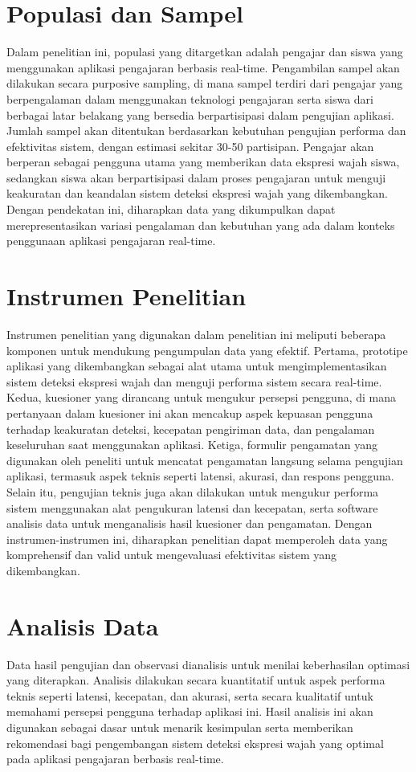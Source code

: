 \section{Populasi dan Sampel}
Dalam penelitian ini, populasi yang ditargetkan adalah pengajar dan siswa yang menggunakan aplikasi pengajaran berbasis real-time. Pengambilan sampel akan dilakukan secara purposive sampling, di mana sampel terdiri dari pengajar yang berpengalaman dalam menggunakan teknologi pengajaran serta siswa dari berbagai latar belakang yang bersedia berpartisipasi dalam pengujian aplikasi. Jumlah sampel akan ditentukan berdasarkan kebutuhan pengujian performa dan efektivitas sistem, dengan estimasi sekitar 30-50 partisipan. Pengajar akan berperan sebagai pengguna utama yang memberikan data ekspresi wajah siswa, sedangkan siswa akan berpartisipasi dalam proses pengajaran untuk menguji keakuratan dan keandalan sistem deteksi ekspresi wajah yang dikembangkan. Dengan pendekatan ini, diharapkan data yang dikumpulkan dapat merepresentasikan variasi pengalaman dan kebutuhan yang ada dalam konteks penggunaan aplikasi pengajaran real-time.

\section{Instrumen Penelitian}
Instrumen penelitian yang digunakan dalam penelitian ini meliputi beberapa komponen untuk mendukung pengumpulan data yang efektif. Pertama, prototipe aplikasi yang dikembangkan sebagai alat utama untuk mengimplementasikan sistem deteksi ekspresi wajah dan menguji performa sistem secara real-time. Kedua, kuesioner yang dirancang untuk mengukur persepsi pengguna, di mana pertanyaan dalam kuesioner ini akan mencakup aspek kepuasan pengguna terhadap keakuratan deteksi, kecepatan pengiriman data, dan pengalaman keseluruhan saat menggunakan aplikasi. Ketiga, formulir pengamatan yang digunakan oleh peneliti untuk mencatat pengamatan langsung selama pengujian aplikasi, termasuk aspek teknis seperti latensi, akurasi, dan respons pengguna. Selain itu, pengujian teknis juga akan dilakukan untuk mengukur performa sistem menggunakan alat pengukuran latensi dan kecepatan, serta software analisis data untuk menganalisis hasil kuesioner dan pengamatan. Dengan instrumen-instrumen ini, diharapkan penelitian dapat memperoleh data yang komprehensif dan valid untuk mengevaluasi efektivitas sistem yang dikembangkan.

\section{Analisis Data}
Data hasil pengujian dan observasi dianalisis untuk menilai keberhasilan optimasi yang diterapkan. Analisis dilakukan secara kuantitatif untuk aspek performa teknis seperti latensi, kecepatan, dan akurasi, serta secara kualitatif untuk memahami persepsi pengguna terhadap aplikasi ini. Hasil analisis ini akan digunakan sebagai dasar untuk menarik kesimpulan serta memberikan rekomendasi bagi pengembangan sistem deteksi ekspresi wajah yang optimal pada aplikasi pengajaran berbasis real-time.
